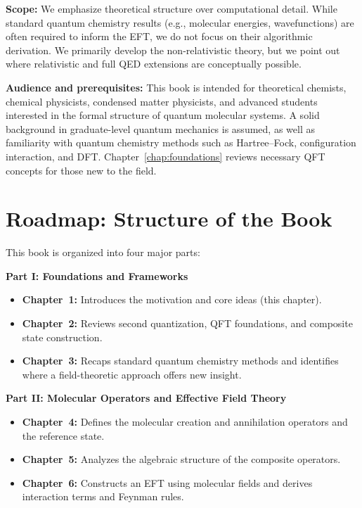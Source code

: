 \textbf{Scope:} We emphasize theoretical structure over computational detail. While standard quantum chemistry results (e.g., molecular energies, wavefunctions) are often required to inform the EFT, we do not focus on their algorithmic derivation. We primarily develop the non-relativistic theory, but we point out where relativistic and full QED extensions are conceptually possible.

\textbf{Audience and prerequisites:} This book is intended for theoretical chemists, chemical physicists, condensed matter physicists, and advanced students interested in the formal structure of quantum molecular systems. A solid background in graduate-level quantum mechanics is assumed, as well as familiarity with quantum chemistry methods such as Hartree–Fock, configuration interaction, and DFT. Chapter~\ref{chap:foundations} reviews necessary QFT concepts for those new to the field.

\section{Roadmap: Structure of the Book}
\label{sec:intro_roadmap}

This book is organized into four major parts:

\textbf{Part I: Foundations and Frameworks}
\begin{itemize}
	\item \textbf{Chapter~1:} Introduces the motivation and core ideas (this chapter).
	\item \textbf{Chapter~2:} Reviews second quantization, QFT foundations, and composite state construction.
	\item \textbf{Chapter~3:} Recaps standard quantum chemistry methods and identifies where a field-theoretic approach offers new insight.
\end{itemize}

\textbf{Part II: Molecular Operators and Effective Field Theory}
\begin{itemize}
	\item \textbf{Chapter~4:} Defines the molecular creation and annihilation operators and the reference state.
	\item \textbf{Chapter~5:} Analyzes the algebraic structure of the composite operators.
	\item \textbf{Chapter~6:} Constructs an EFT using molecular fields and derives interaction terms and Feynman rules.
\end{itemize}

